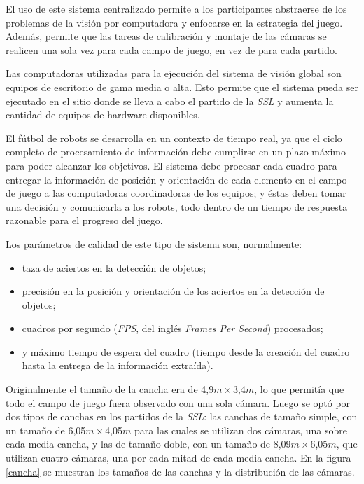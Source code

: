 El uso de este sistema centralizado permite a los participantes abstraerse de
los problemas de la visión por computadora y enfocarse en la estrategia del
juego. Además, permite que las tareas de calibración y montaje de las cámaras se
realicen una sola vez para cada campo de juego, en vez de para cada partido.

Las computadoras utilizadas para la ejecución del sistema de visión global son
equipos de escritorio de gama media o alta. Esto permite que el sistema pueda
ser ejecutado en el sitio donde se lleva a cabo el partido de la \emph{SSL} y
aumenta la cantidad de equipos de hardware disponibles.

El fútbol de robots se desarrolla en un contexto de tiempo real, ya que el
ciclo completo de procesamiento de información debe cumplirse en un plazo
máximo para poder alcanzar los objetivos. El sistema debe procesar cada
cuadro para entregar la información de posición y orientación de cada elemento
en el campo de juego a las computadoras coordinadoras de los equipos; y éstas
deben tomar una decisión y comunicarla a los robots, todo dentro de un tiempo
de respuesta razonable para el progreso del juego.

Los parámetros de calidad de este tipo de sistema son, normalmente:

\begin{itemize}

	\item 	taza de aciertos en la detección de objetos;

	\item 	precisión en la posición y orientación de los aciertos en la
		detección de objetos;

	\item 	cuadros por segundo (\emph{FPS}, del inglés \emph{Frames Per
		Second}) procesados;

	\item 	y máximo tiempo de espera del cuadro (tiempo desde la creación
		del cuadro hasta la entrega de la información extraída).

\end{itemize}

Originalmente el tamaño de la cancha era de 4,9$m\times$3,4$m$, lo que permitía
que todo el campo de juego fuera observado con una sola cámara. Luego se optó
por dos tipos de canchas en los partidos de la \emph{SSL}: las canchas de tamaño
simple, con un tamaño de 6,05$m\times$4,05$m$ para las cuales se utilizan dos
cámaras, una sobre cada media cancha, y las de tamaño doble, con un tamaño de
8,09$m\times$6,05$m$, que utilizan cuatro cámaras, una por cada mitad de cada
media cancha. En la figura \ref{cancha} se muestran los tamaños de las canchas y
la distribución de las cámaras.

